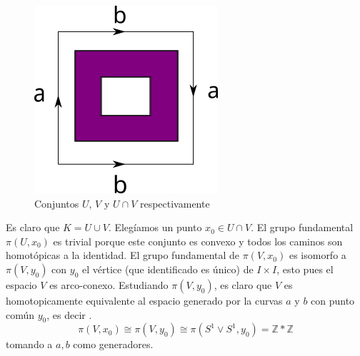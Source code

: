 \begin{ejemplo}
\begin{figure}[h]
    \hspace{3mm}
    \includegraphics[scale=0.5]{./imagenes/kleinUV.png}
    \caption*{Conjuntos \(U\), \(V\) y \(U \cap V\) respectivamente}
  \end{figure}
  Es claro que \(K = U \cup V\). Elegíamos un punto \(x_0 \in U \cap V\).
  El grupo fundamental \(\pi \left( U , x_0 \right) \) es trivial porque
  este conjunto es convexo y todos los caminos son homotópicas a la
  identidad. El grupo fundamental de \(\pi (V, x_0)\) es isomorfo a
  \(\pi (V, y_0)\) con \(y_0\) el vértice (que identificado es único) de \(I
  \times I\), esto pues el espacio \(V\) es arco-conexo. Estudiando
  \(\pi (V, y_0)\), es claro que \(V\) es homotopicamente equivalente al
  espacio generado por la curvas \(a\) y \(b\) con punto común \(y_0\),
  es decir .
  \[ \pi (V, x_0) \cong \pi (V, y_0) \cong \pi (S^1 \vee S^1, y_0) =
    \mathbb Z * \mathbb Z \]
  tomando a \(a,b\) como generadores.


\end{ejemplo}
